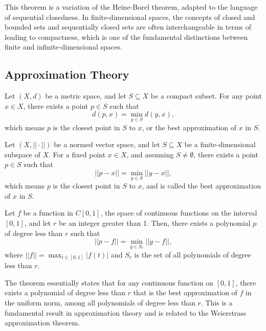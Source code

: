 This theorem is a variation of the Heine-Borel theorem, adapted to the language of sequential closedness. In finite-dimensional spaces, the concepts of closed and bounded sets and sequentially closed sets are often interchangeable in terms of leading to compactness, which is one of the fundamental distinctions between finite and infinite-dimensional spaces.

\subsection{Approximation Theory}

Let \( (X, d) \) be a metric space, and let \( S \subseteq X \) be a compact subset. For any point \( x \in X \), there exists a point \( p \in S \) such that 
    \[
    d(p, x) = \min_{y \in S} d(y, x),
    \]
which means \( p \) is the closest point in \( S \) to \( x \), or the best approximation of \( x \) in \( S \).



\begin{theorem}
    Let \( (X, ||\cdot||) \) be a normed vector space, and let \( S \subseteq X \) be a finite-dimensional subspace of \( X \). For a fixed point \( x \in X \), and assuming \( S \neq \emptyset \), there exists a point \( p \in S \) such that 
    \[
    ||p - x|| = \min_{y \in S} ||y - x||,
    \]
    which means \( p \) is the closest point in \( S \) to \( x \), and is called the best approximation of \( x \) in \( S \).
\end{theorem}

\begin{proposition}
    Let \( f \) be a function in \( C[0,1] \), the space of continuous functions on the interval \([0,1]\), and let \( r \) be an integer greater than 1. Then, there exists a polynomial \( p \) of degree less than \( r \) such that
    \[
    ||p - f|| = \min_{g \in S_r} ||g - f||,
    \]
    where \( ||f|| = \max_{t \in [0,1]} |f(t)| \) and \( S_r \) is the set of all polynomials of degree less than \( r \).
\end{proposition}

The theorem essentially states that for any continuous function on 
$[0,1]$, there exists a polynomial of degree less than
$r$ that is the best approximation of 
$f$ in the uniform norm, among all polynomials of degree less than $r$. This is a fundamental result in approximation theory and is related to the Weierstrass approximation theorem.
